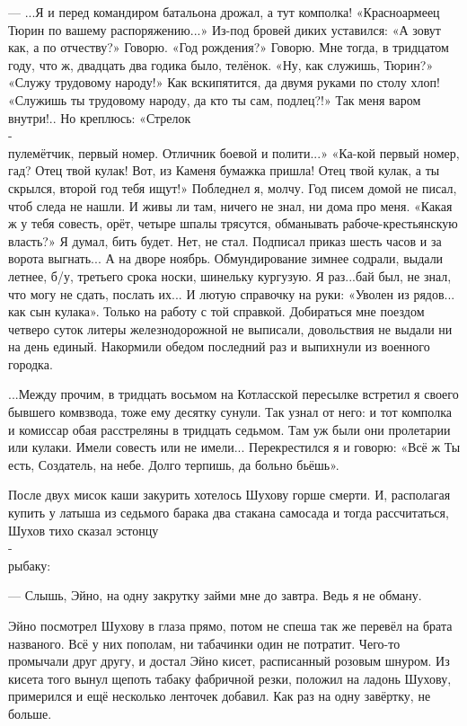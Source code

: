 --- ...Я и перед командиром батальона дрожал, а тут комполка! «Красноармеец Тюрин по вашему
распоряжению...» Из-под бровей диких уставился: «А зовут как, а по отчеству?» Говорю. «Год
рождения?» Говорю. Мне тогда, в тридцатом году, что ж, двадцать два годика было, телёнок. «Ну,
как служишь, Тюрин?» \dash «Служу трудовому народу!» Как вскипятится, да двумя руками по столу \dash
хлоп! «Служишь ты трудовому народу, да кто ты сам, подлец?!» Так меня варом внутри!.. Но
креплюсь: «Стрелок\\-\\пулемётчик, первый номер. Отличник боевой и полити...» \dash «Ка-кой первый
номер, гад? Отец твой кулак! Вот, из Каменя бумажка пришла! Отец твой кулак, а ты скрылся,
второй год тебя ищут!» Побледнел я, молчу. Год писем домой не писал, чтоб следа не нашли. И
живы ли там, ничего не знал, ни дома про меня. «Какая ж у тебя совесть, \dash орёт, четыре шпалы
трясутся, \dash обманывать рабоче-крестьянскую власть?» Я думал, бить будет. Нет, не стал.
Подписал приказ \dash шесть часов и за ворота выгнать... А на дворе \dash ноябрь. Обмундирование
зимнее содрали, выдали летнее, б/у, третьего срока носки, шинельку кургузую. Я \dash раз...бай был,
не знал, что могу не сдать, послать их... И лютую справочку на руки: «Уволен из рядов... как сын
кулака». Только на работу с той справкой. Добираться мне поездом четверо суток \dash литеры
железнодорожной не выписали, довольствия не выдали ни на день единый. Накормили обедом
последний раз и выпихнули из военного городка.

...Между прочим, в тридцать восьмом на Котласской пересылке встретил я своего бывшего
комвзвода, тоже ему десятку сунули. Так узнал от него: и тот комполка и комиссар \dash обая
расстреляны в тридцать седьмом. Там уж были они пролетарии или кулаки. Имели совесть или не
имели... Перекрестился я и говорю: «Всё ж Ты есть, Создатель, на небе. Долго терпишь, да больно
бьёшь».

После двух мисок каши закурить хотелось Шухову горше смерти. И, располагая купить у латыша
из седьмого барака два стакана самосада и тогда рассчитаться, Шухов тихо сказал
эстонцу\\-\\рыбаку:

--- Слышь, Эйно, на одну закрутку займи мне до завтра. Ведь я не обману.

Эйно посмотрел Шухову в глаза прямо, потом не спеша так же перевёл на брата названого. Всё у
них пополам, ни табачинки один не потратит. Чего-то промычали друг другу, и достал Эйно кисет,
расписанный розовым шнуром. Из кисета того вынул щепоть табаку фабричной резки, положил на
ладонь Шухову, примерился и ещё несколько ленточек добавил. Как раз на одну завёртку, не
больше.

